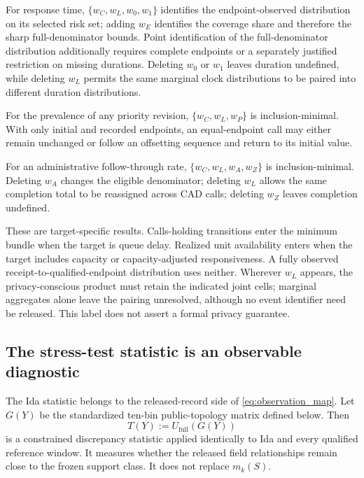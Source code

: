 \documentclass[11pt]{article}
\begin{document}
\begin{plainbox}[title=Target-specific witness-necessity results]
For response time, $\{w_C,w_L,w_0,w_1\}$ identifies the endpoint-observed distribution on its selected risk set; adding $w_E$ identifies the coverage share and therefore the sharp full-denominator bounds. Point identification of the full-denominator distribution additionally requires complete endpoints or a separately justified restriction on missing durations. Deleting $w_0$ or $w_1$ leaves duration undefined, while deleting $w_L$ permits the same marginal clock distributions to be paired into different duration distributions.

For the prevalence of any priority revision, $\{w_C,w_L,w_P\}$ is inclusion-minimal. With only initial and recorded endpoints, an equal-endpoint call may either remain unchanged or follow an offsetting sequence and return to its initial value.

For an administrative follow-through rate, $\{w_C,w_L,w_A,w_Z\}$ is inclusion-minimal. Deleting $w_A$ changes the eligible denominator; deleting $w_L$ allows the same completion total to be reassigned across CAD calls; deleting $w_Z$ leaves completion undefined.
\end{plainbox}

These are target-specific results. Calls-holding transitions enter the minimum bundle when the target is queue delay. Realized unit availability enters when the target includes capacity or capacity-adjusted responsiveness. A fully observed receipt-to-qualified-endpoint distribution uses neither. Wherever $w_L$ appears, the privacy-conscious product must retain the indicated joint cells; marginal aggregates alone leave the pairing unresolved, although no event identifier need be released. This label does not assert a formal privacy guarantee.

\subsection{The stress-test statistic is an observable diagnostic}

The Ida statistic belongs to the released-record side of \cref{eq:observation_map}. Let $G(Y)$ be the standardized ten-bin public-topology matrix defined below. Then
\begin{equation}
T(Y):=U_{\mathrm{full}}(G(Y))
\label{eq:stress_diagnostic}
\end{equation}
is a constrained discrepancy statistic applied identically to Ida and every qualified reference window. It measures whether the released field relationships remain close to the frozen support class. It does not replace $m_k(S)$.
\end{document}
